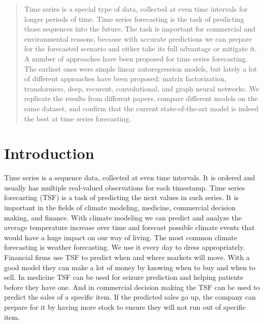\documentclass[conference]{IEEEtran}
\begin{document}
\begin{abstract}
Time series is a special type of data, collected at even time intervals for longer periods of time. Time series forecasting is the task of predicting those sequences into the future. The task is important for commercial and environmental reasons, because with accurate predictions we can prepare for the forecasted scenario and either take its full advantage or mitigate it. A number of approaches have been proposed for time series forecasting. The earliest ones were simple linear autoregression models, but lately a lot of different approaches have been proposed: matrix factorization, transformers, deep, recurent, convolutional, and graph neural networks. We replicate the results from different papers, compare different models on the same dataset, and confirm that the current state-of-the-art model is indeed the best at time series forecasting.
\end{abstract}


%
\IEEEpeerreviewmaketitle

\section{Introduction}

Time series is a sequence data, collected at even time intervals.
It is ordered and usually has multiple real-valued observations for each timestamp.
Time series forecasting (TSF) is a task of predicting the next values in such series.
It is important in the fields of climate modeling, medicine, commercial decision making, and finance.
With climate modeling \cite{mudelsee2019climate} we can predict and analyze the average temperature increase over time and forecast possible climate events that would have a huge impact on our way of living.
The most common climate forecasting is weather forecasting.
We use it every day to dress appropriately.
Financial firms use TSF to predict when and where markets will move.
With a good model they can make a lot of money by knowing when to buy and when to sell.
In medicine TSF can be used for seizure prediction \cite{elger1998siezure} and helping patients before they have one.
And in commercial decision making the TSF can be used to predict the sales of a specific item.
If the predicted sales go up, the company can prepare for it by having more stock to ensure they will not run out of specific item.
\end{document}
